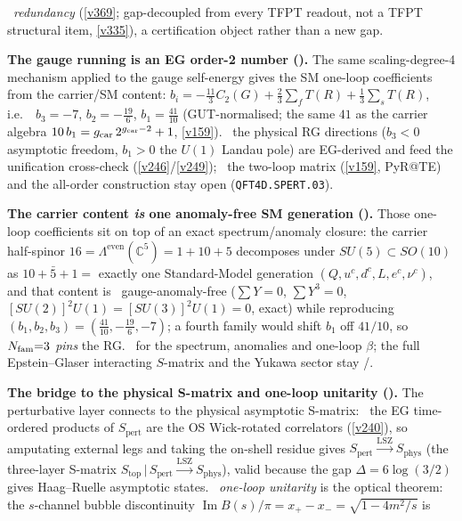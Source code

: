 \mC\ \emph{redundancy} (\vref{v369}; gap-decoupled from every TFPT readout, not a TFPT structural item, \vref{v335}),
a certification object rather than a new gap.
\par\smallskip\noindent\textbf{The gauge running is an EG order-2 number ().}
The same scaling-degree-4 mechanism applied to the gauge self-energy gives the SM one-loop coefficients from the
carrier/SM content: $b_i=-\tfrac{11}{3}C_2(G)+\tfrac23\sum_f T(R)+\tfrac13\sum_s T(R)$, i.e.\ \mE\
$b_3=-7$, $b_2=-\tfrac{19}{6}$, $b_1=\tfrac{41}{10}$ (GUT-normalised; the same $41$ as the carrier algebra
$10\,b_1=g_{\mathrm{car}}\,2^{g_{\mathrm{car}}-2}+1$, \vref{v159}). \mC\ the physical RG directions ($b_3<0$ asymptotic freedom, $b_1>0$
the $U(1)$ Landau pole) are EG-derived and feed the unification cross-check (\vref{v246}/\vref{v249}); \mO\ the
two-loop matrix (\vref{v159}, PyR@TE) and the all-order construction stay open (\texttt{QFT4D.SPERT.03}).
\par\smallskip\noindent\textbf{The carrier content \emph{is} one anomaly-free SM generation ().}
Those one-loop coefficients sit on top of an exact spectrum/anomaly closure: the carrier half-spinor
$16=\Lambda^{\mathrm{even}}(\mathbb C^5)=1{+}10{+}5$ decomposes under $SU(5)\subset SO(10)$ as $10{+}\bar5{+}1=$ exactly
one Standard-Model generation $(Q,u^c,d^c,L,e^c,\nu^c)$, and that content is \mE\ gauge-anomaly-free
($\sum Y=0$, $\sum Y^3=0$, $[SU(2)]^2U(1)=[SU(3)]^2U(1)=0$, exact) while reproducing $(b_1,b_2,b_3)=
(\tfrac{41}{10},-\tfrac{19}{6},-7)$; a fourth family would shift $b_1$ off $41/10$, so $N_{\mathrm{fam}}{=}3$ \emph{pins} the RG.
\mE\ for the spectrum, anomalies and one-loop $\beta$; the full Epstein--Glaser interacting $S$-matrix and the Yukawa
sector stay \mC/\mO.
\par\smallskip\noindent\textbf{The bridge to the physical S-matrix and one-loop unitarity ().}
The perturbative layer connects to the physical asymptotic S-matrix: \mE\ the EG time-ordered products of
$S_{\mathrm{pert}}$ are the OS Wick-rotated correlators (\vref{v240}), so amputating external legs and taking the
on-shell residue gives $S_{\mathrm{pert}}\xrightarrow{\mathrm{LSZ}}S_{\mathrm{phys}}$ (the three-layer S-matrix
$S_{\mathrm{top}}\,|\,S_{\mathrm{pert}}\xrightarrow{\mathrm{LSZ}}S_{\mathrm{phys}}$), valid because the gap
$\Delta{=}6\log(3/2)$ gives Haag--Ruelle asymptotic states. \mE\ \emph{one-loop unitarity} is the optical
theorem: the $s$-channel bubble discontinuity $\operatorname{Im}B(s)/\pi=x_+{-}x_-=\sqrt{1-4m^2/s}$ is
